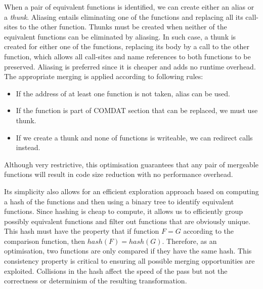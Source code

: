When a pair of equivalent functions is identified, we can create either
an alias or a \textit{thunk}.
Aliasing entails eliminating one of the functions and replacing all its call-sites
to the other function.
Thunks must be created when neither of the equivalent functions can be eliminated
by aliasing.
In such case, a thunk is created for either one of the functions, replacing its
body by a call to the other function, which allows all call-sites and name
references to both functions to be preserved.
Aliasing is preferred since it is cheaper and adds no runtime overhead.
The appropriate merging is applied according to following rules:
\begin{itemize}
\item If the address of at least one function is not taken, alias can be used.
\item If the function is part of COMDAT section that can be replaced, we
must use thunk.
\item If we create a thunk and none of functions is writeable, we can redirect calls
instead.
\end{itemize}
Although very restrictive, this optimisation guarantees that any pair of
mergeable functions will result in code size reduction with no performance
overhead.

Its simplicity also allows for an efficient exploration approach based on computing
a hash of the functions and then using a binary tree to identify equivalent
functions.
Since hashing is cheap to compute, it allows us to efficiently
group possibly equivalent functions and filter out functions
that are obviously unique.
This hash must have the property that if function $F = G$
according to the comparison function, then $hash(F) = hash(G)$.
Therefore, as an optimisation, two functions are only compared if they have the
same hash.
This consistency property is critical to ensuring all possible merging
opportunities are exploited.
Collisions in the hash affect the speed of the pass but not the correctness
or determinism of the resulting transformation.

